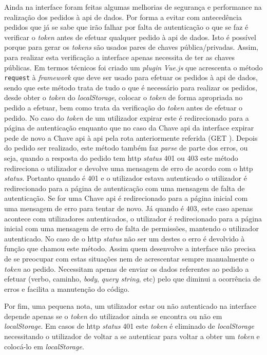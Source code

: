 Ainda na interface foram feitas algumas melhorias de segurança e performance na realização dos pedidos à \acrshort{api} de dados. Por forma a evitar com antecedência pedidos que já se sabe que irão falhar por falta de autenticação o que se faz é verificar o \textit{token} antes de efetuar qualquer pedido à \acrshort{api} de dados. Isto é possível porque para gerar os \textit{tokens} são usados pares de chaves pública/privadas. Assim, para realizar esta verificação a interface apenas necessita de ter as chaves públicas. Em termos técnicos foi criado um \textit{plugin} \textit{Vue.js} que acrescenta o método \texttt{request} à \textit{framework} que deve ser usado para efetuar os pedidos à \acrshort{api} de dados, sendo que este método trata de tudo o que é necessário para realizar os pedidos, desde obter o \textit{token} do \textit{localStorage}, colocar o \textit{token} de forma apropriada no pedido a efetuar, bem como trata da verificação do \textit{token} antes de efetuar o pedido. No caso do \textit{token} de um utilizador expirar este é redirecionado para a página de autenticação enquanto que no caso da Chave \acrshort{api} da interface expirar pede de novo a Chave \acrshort{api} à \acrshort{api} pela rota anteriormente referida (GET ). Depois do pedido ser realizado, este método também faz \textit{parse} de parte dos erros, ou seja, quando a resposta do pedido tem \acrshort{http} \textit{status} 401 ou 403 este método redireciona o utilizador e devolve uma mensagem de erro de acordo com o \acrshort{http} \textit{status}. Portanto quando é 401 e o utilizador estava autenticado o utilizador é redirecionado para a página de autenticação com uma mensagem de falta de autenticação. Se for uma Chave \acrshort{api} é redirecionado para a página inicial com uma mensagem de erro para tentar de novo. Já quando é 403, este caso apenas acontece com utilizadores autenticados, o utilizador é redirecionado para a página inicial com uma mensagem de erro de falta de permissões, mantendo o utilizador autenticado. No caso de o \acrshort{http} \textit{status} não ser um destes o erro é devolvido à função que chamou este método. Assim quem desenvolve a interface não precisa de se preocupar com estas situações nem de acrescentar sempre manualmente o \textit{token} ao pedido. Necessitam apenas de enviar os dados referentes ao pedido a efetuar (verbo, caminho, \textit{body}, \textit{query string}, etc) pelo que diminui a ocorrência de erros e facilita a manutenção do código.

Por fim, uma pequena nota, um utilizador estar ou não autenticado na interface depende apenas se o \textit{token} do utilizador ainda se encontra ou não em \textit{localStorage}. Em casos de \acrshort{http} \textit{status} 401 este \textit{token} é eliminado de \textit{localStorage} necessitando o utilizador de voltar a se autenticar para voltar a obter um \textit{token} e colocá-lo em \textit{localStorage}.

